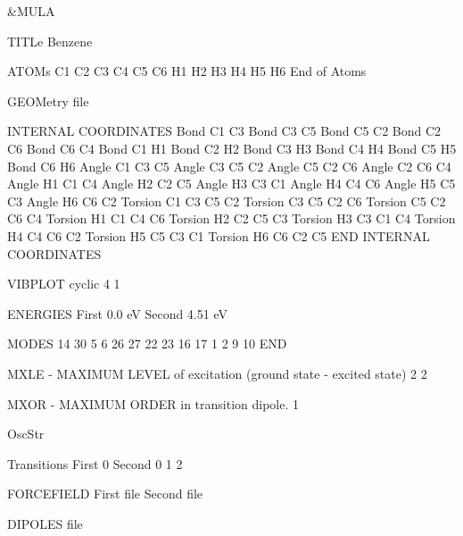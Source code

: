 \begin{inputlisting}
 &MULA

TITLe
 Benzene

ATOMs
  C1
  C2
  C3
  C4
  C5
  C6
  H1
  H2
  H3
  H4
  H5
  H6
End of Atoms

GEOMetry
 file

INTERNAL COORDINATES
 Bond    C1 C3
 Bond    C3 C5
 Bond    C5 C2
 Bond    C2 C6
 Bond    C6 C4
 Bond    C1 H1
 Bond    C2 H2
 Bond    C3 H3
 Bond    C4 H4
 Bond    C5 H5
 Bond    C6 H6
 Angle   C1 C3 C5
 Angle   C3 C5 C2
 Angle   C5 C2 C6
 Angle   C2 C6 C4
 Angle   H1 C1 C4
 Angle   H2 C2 C5
 Angle   H3 C3 C1
 Angle   H4 C4 C6
 Angle   H5 C5 C3
 Angle   H6 C6 C2
 Torsion C1 C3 C5 C2
 Torsion C3 C5 C2 C6
 Torsion C5 C2 C6 C4
 Torsion H1 C1 C4 C6
 Torsion H2 C2 C5 C3
 Torsion H3 C3 C1 C4
 Torsion H4 C4 C6 C2
 Torsion H5 C5 C3 C1
 Torsion H6 C6 C2 C5
END INTERNAL COORDINATES

VIBPLOT
 cyclic 4 1

ENERGIES
 First
  0.0 eV
 Second
  4.51 eV

MODES
 14 30 5 6 26 27 22 23 16 17 1 2 9 10
END

MXLE - MAXIMUM LEVEL of excitation (ground state - excited state)
  2 2

MXOR - MAXIMUM ORDER in transition dipole.
  1

OscStr

Transitions
 First
  0
 Second
  0 1 2

FORCEFIELD
 First
   file
 Second
   file

DIPOLES
 file

\end{inputlisting}
